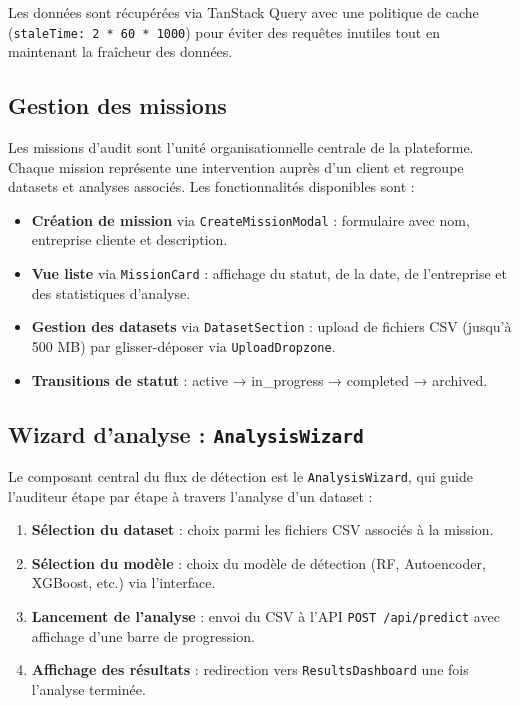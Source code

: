 \documentclass[12pt,a4paper,twoside]{report}
\begin{document}
Les données sont récupérées via TanStack Query avec une politique de cache (\texttt{staleTime: 2 * 60 * 1000}) pour éviter des requêtes inutiles tout en maintenant la fraîcheur des données.

\subsection{Gestion des missions}

Les missions d'audit sont l'unité organisationnelle centrale de la plateforme. Chaque mission représente une intervention auprès d'un client et regroupe datasets et analyses associés. Les fonctionnalités disponibles sont :

\begin{itemize}
  \item \textbf{Création de mission} via \texttt{CreateMissionModal} : formulaire avec nom, entreprise cliente et description.
  \item \textbf{Vue liste} via \texttt{MissionCard} : affichage du statut, de la date, de l'entreprise et des statistiques d'analyse.
  \item \textbf{Gestion des datasets} via \texttt{DatasetSection} : upload de fichiers CSV (jusqu'à 500 MB) par glisser-déposer via \texttt{UploadDropzone}.
  \item \textbf{Transitions de statut} : active → in\_progress → completed → archived.
\end{itemize}

\subsection{Wizard d'analyse : \texttt{AnalysisWizard}}

Le composant central du flux de détection est le \texttt{AnalysisWizard}, qui guide l'auditeur étape par étape à travers l'analyse d'un dataset :

\begin{enumerate}
  \item \textbf{Sélection du dataset} : choix parmi les fichiers CSV associés à la mission.
  \item \textbf{Sélection du modèle} : choix du modèle de détection (RF, Autoencoder, XGBoost, etc.) via l'interface.
  \item \textbf{Lancement de l'analyse} : envoi du CSV à l'API \texttt{POST /api/predict} avec affichage d'une barre de progression.
  \item \textbf{Affichage des résultats} : redirection vers \texttt{ResultsDashboard} une fois l'analyse terminée.
\end{enumerate}
\end{document}
